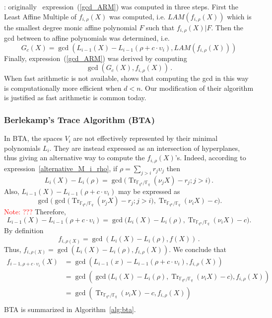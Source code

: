 \documentclass{article}
\newcommand{\ff}[1]{\mathbb{F}_{#1}}
\newcommand{\qq}{q}
\newcommand{\nn}{n}
\newcommand{\qn}{{\qq^\nn}}
\newcommand{\basef}{\ff{\qq}}
\newcommand{\extf}{\ff{\qn}}
\DeclareMathOperator{\Tr}{Tr}
\newcounter{algo}
\newcommand{\Notes}[1]{\textcolor{red}{Note: #1}}
\begin{document}
: originally~\cite{van1989geometric} expression~(\ref{gcd_ARM}) was computed in three steps. First the Least Affine Multiple of 
$f_{i,\rho}(X)$ was computed, i.e. $LAM(f_{i,\rho}(X))$ which is  the smallest degree monic affine polynomial $F$ such that $f_{i,\rho}(X)|F$. Then the gcd between to affine polynomials was determined, i.e. 
$$G_c(X)=\gcd(L_{i-1}(X)-L_{i-1}(\rho+c \cdot \upsilon_i),LAM(f_{i,\rho}(X)) ) $$
Finally, expression~(\ref{gcd_ARM}) was derived by computing
$$\gcd(G_c(X), f_{i,\rho}(X))\,.$$
When fast arithmetic is not available, \cite{van1989geometric} shows that computing the gcd in this way is computationally more efficient when $d<n$. Our modification of their algorithm is justified as fast arithmetic is common today.




\subsubsection{Berlekamp's Trace Algorithm (BTA)}
\label{sec:BTA}
In BTA, the spaces $V_{i}$ are not effectively represented by their minimal polynomials $L_i$. They are instead expressed as an intersection of hyperplanes, thus giving an alternative way to compute the $f_{i,\rho}(X)$'s. Indeed, according to expression~\eqref{alternative_M_i_rho}, if $\rho=\sum_{j>i}r_j\upsilon_j$ then
$$L_i(X)-L_i(\rho)=\gcd\bigl(\Tr_{\extf/\basef}(\nu_j X) -r_j ;j>i\bigr)\,.$$
Also, $L_{i-1}(X)-L_{i-1}(\rho +c \cdot \upsilon_i)$ may be expressed as
$$
\gcd\bigl(\gcd\bigl(\Tr_{\extf/\basef}(\nu_j X) -r_j ;j>i\bigr), \Tr_{\extf/\basef}(\nu_i X) -c  \bigr).
$$
\Notes{???}
Therefore, 
\begin{equation}
\label{alt_formula}
L_{i-1}(X)-L_{i-1}(\rho +c \cdot \upsilon_i)=
\gcd\bigl(L_i(X)-L_i(\rho), \Tr_{\extf/\basef}(\nu_i X) -c  \bigr).
\end{equation}
By definition 
$$f_{i,\rho(X)}=\gcd(L_i(X)-L_i(\rho),f(X))\,.$$ 
Thus, $f_{i,\rho(X)}=\gcd(L_i(X)-L_i(\rho),f_{i,\rho}(X))$.
We conclude that 
\begin{equation}
\label{eq:bta:key}
\begin{aligned}
f_{i-1,\rho+c \cdot \upsilon_i}(X)&=\gcd(L_{i-1}(x)-L_{i-1}(\rho +c \cdot \upsilon_i) ,f_{i,\rho}(X)  ) \\
&=  \gcd(  \gcd\bigl(L_i(X)-L_i(\rho), \Tr_{\extf/\basef}(\nu_i X) -c  \bigr)     ,  f_{i,\rho}(X) )    \\
&=  \gcd( \Tr_{\extf/\basef}(\nu_i X) -c ,  f_{i,\rho}(X) )    \\
\end{aligned}
\end{equation}
BTA is summarized in Algorithm~\ref{alg:bta}.
\end{document}
